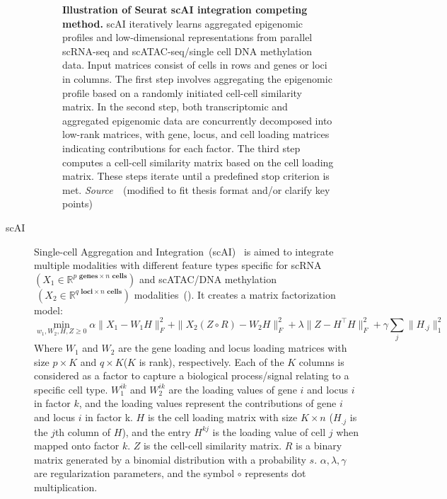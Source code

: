 \begin{description}
\begin{figure}[!h]
  	\vspace{0.1cm}
  	\caption[Illustration of Seurat scAI integration competing method.]{\textbf{Illustration of Seurat scAI integration competing method.} scAI iteratively learns aggregated epigenomic profiles and low-dimensional representations from parallel scRNA-seq and scATAC-seq/single cell DNA methylation data. Input matrices consist of cells in rows and genes or loci in columns. The first step involves aggregating the epigenomic profile based on a randomly initiated cell-cell similarity matrix. In the second step, both transcriptomic and aggregated epigenomic data are concurrently decomposed into low-rank matrices, with gene, locus, and cell loading matrices indicating contributions for each factor. The third step computes a cell-cell similarity matrix based on the cell loading matrix. These steps iterate until a predefined stop criterion is met. \emph{Source~\cite{jin2020scai}}~(modified to fit thesis format and/or clarify key points)
  }
  	\label{fig:Alg_scAI}
\end{figure}

  \item[scAI]
  Single-cell Aggregation and Integration~(scAI)~\citep{jin2020scai} is aimed to integrate multiple modalities with different feature types specific for scRNA $(X_1\in \mathbb{R}^{p \textbf{ genes} \times n \textbf{ cells}})$ and scATAC/DNA methylation$~(X_2\in \mathbb{R}^{q \textbf{ loci}\times n \textbf{ cells}})$ modalities~(). It creates a matrix factorization model:
  \begin{equation}
  \min_{w_1,W_2,H,Z\geq 0} \alpha \|X_1-W_1H\|_F^2 + \|X_2(Z \circ R)-W_2H\|_F^2 + \lambda \|Z-H^\top H\|_F^2 + \gamma\sum_j \|H_{.j}\|_1^2
  \end{equation}
  Where $W_1$ and $W_2$ are the gene loading and locus loading matrices with size $p\times K$ and $q\times K$($K$ is rank), respectively. Each of the $K$ columns is considered as a factor to capture a biological process/signal relating to a specific cell type. $W_1^{ik}$ and $W_2^{ik}$ are the loading values of gene $i$ and locus $i$ in factor $k$, and the loading values represent the contributions of gene $i$ and locus $i$ in factor k. $H$ is the cell loading matrix with size $K\times n$ ($H_{.j}$ is the $j$th column of $H$), and the entry $H^{kj}$ is the loading value of cell $j$ when mapped onto factor $k$. $Z$ is the cell-cell similarity matrix. $R$ is a binary matrix generated by a binomial distribution with a probability $s$. $\alpha, \lambda, \gamma$ are regularization parameters, and the symbol $\circ$ represents dot multiplication.



\end{description}
